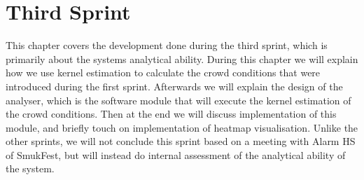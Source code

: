 \chapter{Third Sprint}\label{ch:sprint3}

This chapter covers the development done during the third sprint, which is primarily about the systems analytical ability. During this chapter we will explain how we use kernel estimation to calculate the crowd conditions that were introduced during the first sprint. Afterwards we will explain the design of the analyser, which is the software module that will execute the kernel estimation of the crowd conditions. Then at the end we will discuss implementation of this module, and briefly touch on implementation of heatmap visualisation. Unlike the other sprints, we will not conclude this sprint based on a meeting with Alarm HS of SmukFest, but will instead do internal assessment of the analytical ability of the system.







